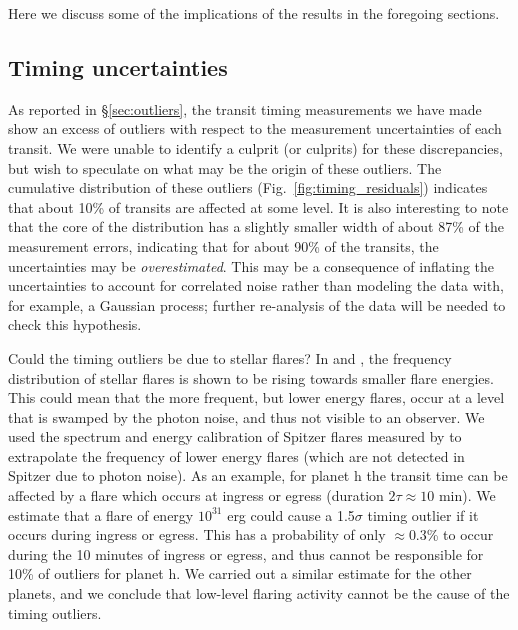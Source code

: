 \documentclass[twocolumn]{aastex63}
\begin{document}
Here we discuss some of the implications of the results in the foregoing sections.

\subsection{Timing uncertainties}

As reported in \S \ref{sec:outliers}, the transit timing measurements we have made show an excess of outliers with respect to the measurement uncertainties of each transit.  We were unable to identify a culprit (or culprits) for these discrepancies, but wish to speculate on what may be the origin of these outliers.  The cumulative distribution of these outliers (Fig.\ \ref{fig:timing_residuals}) indicates that about 10\% of transits
are affected at some level.  It is also interesting to note that the core of the distribution has a slightly smaller width of about 87\% of the measurement errors, indicating that for about 90\% of the transits, the uncertainties may be \emph{overestimated}.  This may be a consequence of inflating the uncertainties to account for correlated noise rather than modeling the data with, for example, a Gaussian process;  further re-analysis of the data will be needed to check this hypothesis.

Could the timing outliers be due to stellar flares?  In \citet{Vida_2017} and \citet{Ducrot2020}, the frequency distribution of stellar flares is shown to be rising towards smaller flare energies.  This could mean that the more frequent, but lower energy flares, occur at a level that is swamped by the photon noise, and thus not visible to an observer.  We used the spectrum and energy calibration of Spitzer flares measured by \citet{Ducrot2020} to extrapolate the frequency of lower energy flares (which are not detected in Spitzer due to photon noise).  As an example, for planet h the transit time can be affected by a flare which occurs at ingress or egress (duration $2\tau \approx 10$ min).  %
We estimate that a flare of energy $10^{31}$ erg could cause a 1.5$\sigma$
timing outlier if it occurs during ingress or egress.  This has a probability of only $\approx 0.3$\% to occur during the 10 minutes of ingress or egress,
and thus cannot be responsible for 10\% of outliers for planet h.  We carried out a similar estimate for
the other planets, and we conclude that low-level flaring activity cannot be the cause of the timing outliers.
\end{document}
